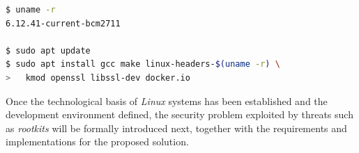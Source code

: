 \begin{code}[h!]
\begin{lstlisting}[language=bash]
$ uname -r
6.12.41-current-bcm2711

$ sudo apt update
$ sudo apt install gcc make linux-headers-$(uname -r) \
>   kmod openssl libssl-dev docker.io
\end{lstlisting}
\caption[Installation of the development environment.]{Installation of the development environment on \textit{Armbian} based on \textit{Ubuntu Noble}.}
\label{cod:dev_env_install}
\end{code}

\newpage

Once the technological basis of \textit{Linux} systems has been established and the development environment defined, the security problem exploited by threats such as \textit{rootkits} will be formally introduced next, together with the requirements and implementations for the proposed solution.
